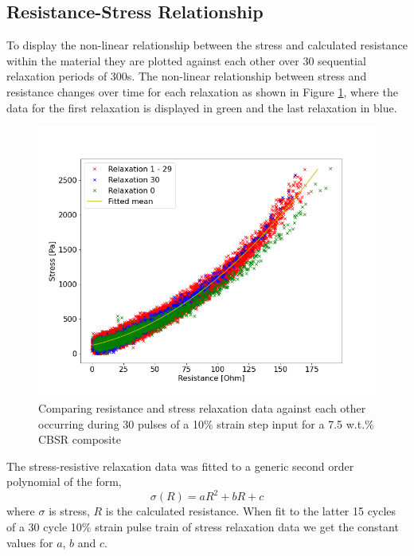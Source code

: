 \subsection{Resistance-Stress Relationship}
To display the non-linear relationship between the stress and calculated resistance within the material they are plotted against each other over 30 sequential relaxation periods of 300s. The non-linear relationship between stress and resistance changes over time for each relaxation as shown in Figure \ref{fig:res_vs_stress_30pulses}, where the data for the first relaxation is displayed in green and the last relaxation in blue.
\begin{figure}[H]
	\centering
	\includegraphics[width=0.7\linewidth]{Figures/relax_res_stress_non_lin_rgby_MAF8_2_7-5_Epin_20mm_v3.png}
	\caption{Comparing resistance and stress relaxation data against each other occurring during 30 pulses of a 10\% strain step input for a 7.5 w.t.\% CBSR composite}
	\label{fig:res_vs_stress_30pulses}
\end{figure}
The stress-resistive relaxation data was fitted to a generic second order polynomial of the form, 
\begin{equation}
	\sigma(R) = aR^2+bR+c
	\label{eqn:poly_res_stress}
\end{equation}
where $\sigma$ is stress, $R$ is the calculated resistance. When fit to the latter 15 cycles of a 30 cycle 10\% strain pulse train of stress relaxation data we get the constant values for $a$, $b$ and $c$.
